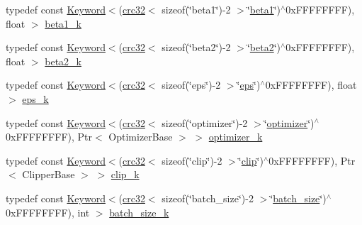 \begin{DoxyCompactItemize}
\item 
typedef const \hyperlink{classmarian_1_1keywords_1_1Keyword}{Keyword}$<$(\hyperlink{compile__time__crc32_8h_afb8250edaa6a10de4050142c2361fbce}{crc32}$<$ sizeof(\char`\"{}beta1\char`\"{})-\/2 $>$\char`\"{}\hyperlink{namespacemarian_1_1keywords_aceaa175e141154e5fece90ab49f2c5aa}{beta1}\char`\"{})$^\wedge$0x\+F\+F\+F\+F\+F\+F\+F\+F), float $>$ \hyperlink{namespacemarian_1_1keywords_a1305f7d1623cc0bdc776760b61ead5c0}{beta1\+\_\+k}
\item 
typedef const \hyperlink{classmarian_1_1keywords_1_1Keyword}{Keyword}$<$(\hyperlink{compile__time__crc32_8h_afb8250edaa6a10de4050142c2361fbce}{crc32}$<$ sizeof(\char`\"{}beta2\char`\"{})-\/2 $>$\char`\"{}\hyperlink{namespacemarian_1_1keywords_a2b99ef30dc7e4dc7780b29dc3059486f}{beta2}\char`\"{})$^\wedge$0x\+F\+F\+F\+F\+F\+F\+F\+F), float $>$ \hyperlink{namespacemarian_1_1keywords_a8c433988725a968d8f443937345116ff}{beta2\+\_\+k}
\item 
typedef const \hyperlink{classmarian_1_1keywords_1_1Keyword}{Keyword}$<$(\hyperlink{compile__time__crc32_8h_afb8250edaa6a10de4050142c2361fbce}{crc32}$<$ sizeof(\char`\"{}eps\char`\"{})-\/2 $>$\char`\"{}\hyperlink{namespacemarian_1_1keywords_a94a12c2471667d9574d8b013796ec1cc}{eps}\char`\"{})$^\wedge$0x\+F\+F\+F\+F\+F\+F\+F\+F), float $>$ \hyperlink{namespacemarian_1_1keywords_a5f02b3d29c552bc4052504dc4d09c512}{eps\+\_\+k}
\item 
typedef const \hyperlink{classmarian_1_1keywords_1_1Keyword}{Keyword}$<$(\hyperlink{compile__time__crc32_8h_afb8250edaa6a10de4050142c2361fbce}{crc32}$<$ sizeof(\char`\"{}optimizer\char`\"{})-\/2 $>$\char`\"{}\hyperlink{namespacemarian_1_1keywords_a80ff29066a595f1c7e2dd6858b048397}{optimizer}\char`\"{})$^\wedge$0x\+F\+F\+F\+F\+F\+F\+F\+F), Ptr$<$ Optimizer\+Base $>$ $>$ \hyperlink{namespacemarian_1_1keywords_a1ab9bde7cf138c91b907dcdd052dfa6b}{optimizer\+\_\+k}
\item 
typedef const \hyperlink{classmarian_1_1keywords_1_1Keyword}{Keyword}$<$(\hyperlink{compile__time__crc32_8h_afb8250edaa6a10de4050142c2361fbce}{crc32}$<$ sizeof(\char`\"{}clip\char`\"{})-\/2 $>$\char`\"{}\hyperlink{namespacemarian_1_1keywords_a1ce7910671af4bcc0573570988101938}{clip}\char`\"{})$^\wedge$0x\+F\+F\+F\+F\+F\+F\+F\+F), Ptr$<$ Clipper\+Base $>$ $>$ \hyperlink{namespacemarian_1_1keywords_a06bef77d1eaa2a3939d9bf156f7e3736}{clip\+\_\+k}
\item 
typedef const \hyperlink{classmarian_1_1keywords_1_1Keyword}{Keyword}$<$(\hyperlink{compile__time__crc32_8h_afb8250edaa6a10de4050142c2361fbce}{crc32}$<$ sizeof(\char`\"{}batch\+\_\+size\char`\"{})-\/2 $>$\char`\"{}\hyperlink{namespacemarian_1_1keywords_a4b1f0356184ca2853fdb084cafa3ffba}{batch\+\_\+size}\char`\"{})$^\wedge$0x\+F\+F\+F\+F\+F\+F\+F\+F), int $>$ \hyperlink{namespacemarian_1_1keywords_acc29b3bc2c61d954c306fca0cf7113e5}{batch\+\_\+size\+\_\+k}

\end{DoxyCompactItemize}
